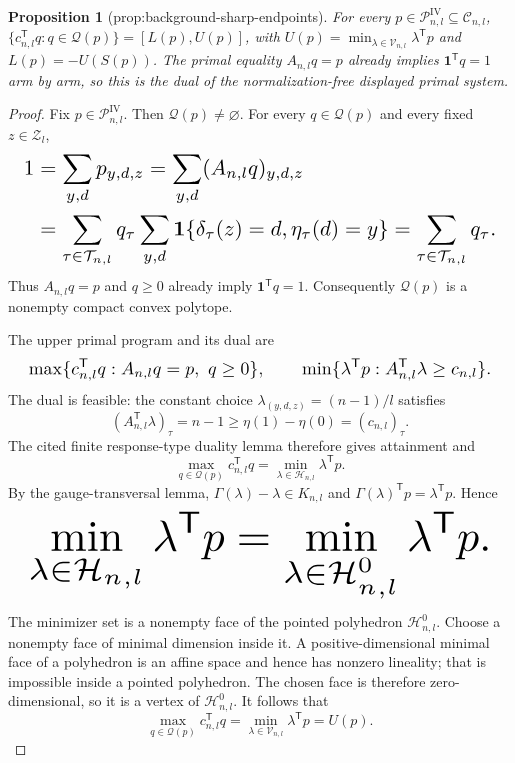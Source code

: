 \documentclass{article}
\newtheorem{proposition}{Proposition}
\begin{document}
\begin{proposition}[prop:background-sharp-endpoints]\label{prop:background-sharp-endpoints}
For every \(p\in\mathcal P^{\mathrm{IV}}_{n,l}\subseteq\mathcal C_{n,l}\), \(\{c_{n,l}^{\mathsf T}q:q\in\mathcal Q(p)\}=[L(p),U(p)]\), with \(U(p)=\min_{\lambda\in\mathcal V_{n,l}}\lambda^{\mathsf T}p\) and \(L(p)=-U(S(p))\). The primal equality \(A_{n,l}q=p\) already implies \(\mathbf1^{\mathsf T}q=1\) arm by arm, so this is the dual of the normalization-free displayed primal system.
\end{proposition}
\begin{proof}
Fix \(p\in\mathcal P^{\mathrm{IV}}_{n,l}\). Then \(\mathcal Q(p)\ne\varnothing\). For every \(q\in\mathcal Q(p)\) and every fixed \(z\in\mathcal Z_l\),
\[
\makebox[\linewidth][c]{\resizebox{0.98\linewidth}{!}{\(\displaystyle \begin{aligned}
1&=\sum_{y,d}p_{y,d,z}=\sum_{y,d}(A_{n,l}q)_{y,d,z}\\
&=\sum_{\tau\in\mathcal T_{n,l}}q_\tau\sum_{y,d}\mathbf 1\{\delta_\tau(z)=d,\eta_\tau(d)=y\}=\sum_{\tau\in\mathcal T_{n,l}}q_\tau.
\end{aligned}\)}}
\]
Thus \(A_{n,l}q=p\) and \(q\ge0\) already imply \(\mathbf 1^{\mathsf T}q=1\). Consequently \(\mathcal Q(p)\) is a nonempty compact convex polytope.

The upper primal program and its dual are
\[
\makebox[\linewidth][c]{\resizebox{0.98\linewidth}{!}{\par\noindent \makebox[\linewidth][c]{\resizebox{0.98\linewidth}{!}{\(\displaystyle \displaystyle \max\{c_{n,l}^{\mathsf T}q:A_{n,l}q=p,\ q\ge0\},\qquad \min\{\lambda^{\mathsf T}p:A_{n,l}^{\mathsf T}\lambda\ge c_{n,l}\}.\)}}\par\noindent}}
\]
The dual is feasible: the constant choice \(\lambda_{(y,d,z)}=(n-1)/l\) satisfies
\[
(A_{n,l}^{\mathsf T}\lambda)_\tau=n-1\ge\eta(1)-\eta(0)=(c_{n,l})_\tau.
\]
The cited finite response-type duality lemma therefore gives attainment and
\[
\max_{q\in\mathcal Q(p)}c_{n,l}^{\mathsf T}q=\min_{\lambda\in\mathcal H_{n,l}}\lambda^{\mathsf T}p.
\]
By the gauge-transversal lemma, \(\Gamma(\lambda)-\lambda\in K_{n,l}\) and \(\Gamma(\lambda)^{\mathsf T}p=\lambda^{\mathsf T}p\). Hence
\[
\makebox[\linewidth][c]{\resizebox{0.98\linewidth}{!}{\par\noindent \makebox[\linewidth][c]{\resizebox{0.98\linewidth}{!}{\(\displaystyle \displaystyle \min_{\lambda\in\mathcal H_{n,l}}\lambda^{\mathsf T}p=\min_{\lambda\in\mathcal H^0_{n,l}}\lambda^{\mathsf T}p.\)}}\par\noindent}}
\]
The minimizer set is a nonempty face of the pointed polyhedron \(\mathcal H^0_{n,l}\). Choose a nonempty face of minimal dimension inside it. A positive-dimensional minimal face of a polyhedron is an affine space and hence has nonzero lineality; that is impossible inside a pointed polyhedron. The chosen face is therefore zero-dimensional, so it is a vertex of \(\mathcal H^0_{n,l}\). It follows that
\[
\max_{q\in\mathcal Q(p)}c_{n,l}^{\mathsf T}q=\min_{\lambda\in\mathcal V_{n,l}}\lambda^{\mathsf T}p=U(p).
\]


\end{proof}
\end{document}
